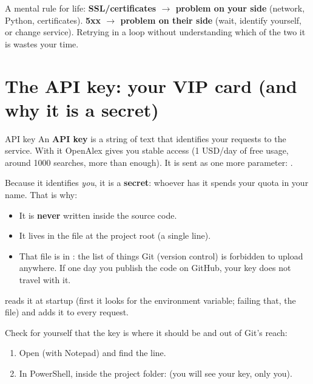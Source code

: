 \documentclass[11pt,a4paper]{article}
\begin{document}
\begin{ojo}
A mental rule for life: \textbf{SSL/certificates $\rightarrow$ problem on your side}
(network, Python, certificates). \textbf{5xx $\rightarrow$ problem on their side} (wait,
identify yourself, or change service). Retrying in a loop without understanding which of the
two it is wastes your time.
\end{ojo}

\section{The API key: your VIP card (and why it is a secret)}

\begin{concepto}{API key}
An \textbf{API key} is a string of text that identifies your requests to the service. With
it OpenAlex gives you stable access (1 USD/day of free usage, around 1000 searches, more than
enough). It is sent as one more parameter: .

Because it identifies \emph{you}, it is a \textbf{secret}: whoever has it spends your quota
in your name. That is why:
\begin{itemize}
  \item It is \textbf{never} written inside the source code.
  \item It lives in the  file at the project root (a single line).
  \item That file is in : the list of things Git (version control) is
        forbidden to upload anywhere. If one day you publish the code on GitHub, your key
        does not travel with it.
\end{itemize}
 reads it at startup (first it looks for the 
environment variable; failing that, the file) and  adds it to every request.
\end{concepto}

\begin{practica}
Check for yourself that the key is where it should be and out of Git's reach:
\begin{enumerate}
  \item Open  (with Notepad) and find the  line.
  \item In PowerShell, inside the project folder:
         \quad (you will see your key, only you).
\end{enumerate}
\end{practica}
\end{document}
